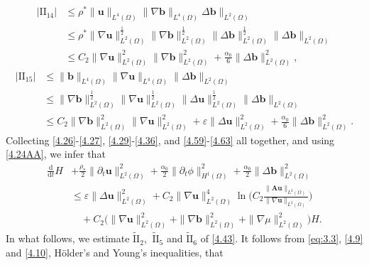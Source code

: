 \documentclass[11pt]{article}
\numberwithin{equation}{section}
\begin{document}
\begin{equation}\label{4.62}
\begin{split}
|\text{II}_{14}|&\leq \rho^*\|\mathbf{u}\|_{L^4(\Omega)}\|\nabla\mathbf{b}\|_{L^4(\Omega)}
\Delta\mathbf{b}\|_{L^2(\Omega)} \\
&\leq
\rho^*\|\nabla\mathbf{u}\|_{L^2(\Omega)}^{\frac{1}{2}}
\|\nabla\mathbf{b}\|_{L^2(\Omega)}^{\frac{1}{2}}
\|\Delta\mathbf{b}\|_{L^2(\Omega)}^{\frac{1}{2}}
\|\Delta\mathbf{b}\|_{L^2(\Omega)} \\
&\leq
C_{2}\|\nabla\mathbf{u}\|_{L^2(\Omega)}^2\|\nabla\mathbf{b}\|_{L^2(\Omega)}^2
+\frac{\alpha_0}{6}\|\Delta\mathbf{b}\|_{L^2(\Omega)}^2 ,
\end{split}
\end{equation}
\begin{equation}\label{4.63}
\begin{split}
|\text{II}_{15}|&\leq \|\mathbf{b}\|_{L^4(\Omega)}
\|\nabla\mathbf{u}\|_{L^4(\Omega)}\|\Delta\mathbf{b}\|_{L^2(\Omega)} \\
&\leq
\|\nabla\mathbf{b}\|_{L^2(\Omega)}^{\frac{1}{2}}
\|\nabla\mathbf{u}\|_{L^2(\Omega)}^{\frac{1}{2}}
\|\Delta\mathbf{u}\|_{L^2(\Omega)}^{\frac{1}{2}}
\|\Delta\mathbf{b}\|_{L^2(\Omega)}  \\
&\leq
C_{2}\|\nabla\mathbf{b}\|_{L^2(\Omega)}^2\|\nabla\mathbf{u}\|_{L^2(\Omega)}^2
+\varepsilon\|\Delta\mathbf{u}\|_{L^2(\Omega)}^2
+\frac{\alpha_0}{6}\|\Delta\mathbf{b}\|_{L^2(\Omega)} ^{2}.
\end{split}
\end{equation}
Collecting \eqref{4.26}-\eqref{4.27}, \eqref{4.29}-\eqref{4.36}, and \eqref{4.59}-\eqref{4.63} all together, and using \eqref{4.24AA}, we infer that
\begin{equation}\label{4.64}
\begin{split}
\frac{\mathrm{d}}{\mathrm{d}t}H&+\frac{\rho_*}{2}\|\partial_t \mathbf{u}\|_{L^2(\Omega)}^2+\frac{\alpha_0}{2}\|\partial_t\phi\|_{H^1(\Omega)}^2
+\frac{\alpha_0}{2}\|\Delta\mathbf{b}\|_{L^2(\Omega)}^2\\
&\leq \varepsilon\|\Delta \mathbf{u}\|_{L^2(\Omega)}^2+C_2\|\nabla \mathbf{u}\|_{L^2(\Omega)}^4\ln\Big(C_2\frac{\|\mathbf{A} \mathbf{u}\|_{L^2(\Omega)}}{\|\nabla \mathbf{u}\|_{L^2(\Omega)}}\Big )
\\&\quad+C_2\big(\|\nabla \mathbf{u}\|_{L^2(\Omega)}^2+\|\nabla \mathbf{b}\|_{L^2(\Omega)}^2+\|\nabla\mu\|_{L^2(\Omega)}^2\big)H.
\end{split}
\end{equation}
In what follows,  we estimate $ \tilde{\text{II}}_2$, $\ \tilde{\text{II}}_5$ and $ \tilde{\text{II}}_6$ of \eqref{4.43}. It follows from  \eqref{eq:3.3}, \eqref{4.9} and \eqref{4.10},  H\"{o}lder's and Young's inequalities, that
\end{document}

